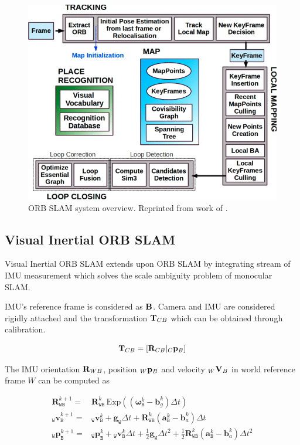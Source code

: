\begin{figure}
	\centering
	\includegraphics[width=5in]{figures/orb_slam1}
	\caption[ORB SLAM architecture]{\small 
		ORB SLAM system overview. Reprinted from work of . }
	\label{fig:orb_slam1}
\end{figure}

\subsection{Visual Inertial ORB SLAM}

Visual Inertial ORB SLAM  extends upon ORB SLAM by integrating stream of IMU measurement which solves the scale ambiguity problem of monocular SLAM.

IMU's reference frame is considered as ${\bf B}$. Camera and IMU are considered rigidly attached and the transformation ${\bf T}_{CB}$ which can be obtained through calibration.

\begin{equation}
{\bf T}_{CB} = [{\bf R}_{CB} \vert _C{\bf p}_B]
\end{equation}

The IMU orientation ${\bf R}_{WB}$, position $_W{\bf p}_B$ and velocity $_W{\bf V}_B$ in world reference frame $W$ can be computed as

\begin{align} \mathbf {R}^{k+1}_\mathtt {WB} = & \mathbf {R}^{k}_\mathtt {WB} \, \text{Exp}\left(\left(\boldsymbol {\omega }^k_\mathtt {B} - \boldsymbol {b}^k_g\right)\Delta t\right) \nonumber\\ _\mathtt {W}\mathbf {v}^{k+1}_\mathtt {B} = & {_\mathtt {W}\mathbf {v}^{k}_\mathtt {B}} + \mathbf {g}_\mathtt {W} \Delta t + \mathbf {R}^{k}_\mathtt {WB} \left(\boldsymbol {a}^k_\mathtt {B} - \boldsymbol {b}^k_a\right)\Delta t \nonumber\\ _\mathtt {W}\mathbf {p}^{k+1}_\mathtt {B} = & {_\mathtt {W}\mathbf {p}^{k}_\mathtt {B}} + {_\mathtt {W}\mathbf {v}^{k}_\mathtt {B}} \Delta t + \frac{1}{2}\mathbf {g}_\mathtt {W} \Delta t^2 + \frac{1}{2} \mathbf {R}^{k}_\mathtt {WB} \left(\boldsymbol {a}^k_\mathtt {B} - \boldsymbol {b}^k_a\right)\Delta t^2 \end{align}

